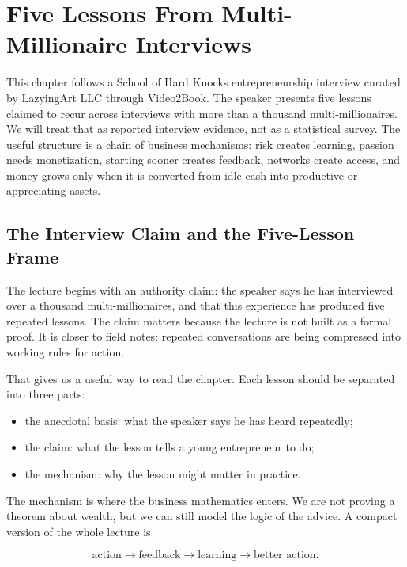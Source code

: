 \chapter{Five Lessons From Multi-Millionaire Interviews}

This chapter follows a School of Hard Knocks entrepreneurship interview curated by LazyingArt LLC through Video2Book. The speaker presents five lessons claimed to recur across interviews with more than a thousand multi-millionaires. We will treat that as reported interview evidence, not as a statistical survey. The useful structure is a chain of business mechanisms: risk creates learning, passion needs monetization, starting sooner creates feedback, networks create access, and money grows only when it is converted from idle cash into productive or appreciating assets.

\section{The Interview Claim and the Five-Lesson Frame}

The lecture begins with an authority claim: the speaker says he has interviewed over a thousand multi-millionaires, and that this experience has produced five repeated lessons. The claim matters because the lecture is not built as a formal proof. It is closer to field notes: repeated conversations are being compressed into working rules for action.

That gives us a useful way to read the chapter. Each lesson should be separated into three parts:

\begin{itemize}
\item the anecdotal basis: what the speaker says he has heard repeatedly;
\item the claim: what the lesson tells a young entrepreneur to do;
\item the mechanism: why the lesson might matter in practice.
\end{itemize}

The mechanism is where the business mathematics enters. We are not proving a theorem about wealth, but we can still model the logic of the advice. A compact version of the whole lecture is

\begin{equation}
\text{action} \longrightarrow \text{feedback} \longrightarrow \text{learning} \longrightarrow \text{better action}.
\end{equation}

